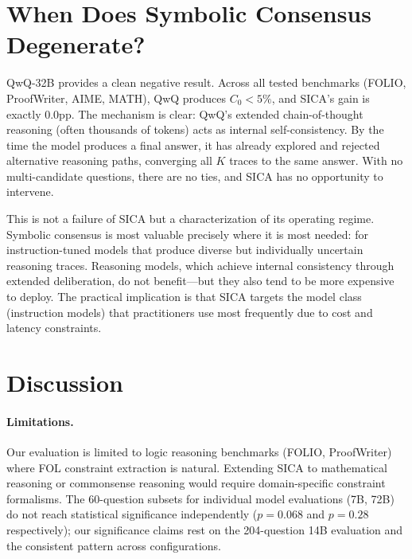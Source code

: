 \documentclass[11pt,a4paper]{article}
\begin{document}
\section{When Does Symbolic Consensus Degenerate?}
\label{sec:degenerate}

QwQ-32B provides a clean negative result. Across all tested benchmarks (FOLIO, ProofWriter, AIME, MATH), QwQ produces $C_0 < 5\%$, and SICA's gain is exactly 0.0pp. The mechanism is clear: QwQ's extended chain-of-thought reasoning (often thousands of tokens) acts as internal self-consistency. By the time the model produces a final answer, it has already explored and rejected alternative reasoning paths, converging all $K$ traces to the same answer. With no multi-candidate questions, there are no ties, and SICA has no opportunity to intervene.

This is not a failure of SICA but a characterization of its operating regime. Symbolic consensus is most valuable precisely where it is most needed: for instruction-tuned models that produce diverse but individually uncertain reasoning traces. Reasoning models, which achieve internal consistency through extended deliberation, do not benefit---but they also tend to be more expensive to deploy. The practical implication is that SICA targets the model class (instruction models) that practitioners use most frequently due to cost and latency constraints.

\section{Discussion}

\paragraph{Limitations.}
Our evaluation is limited to logic reasoning benchmarks (FOLIO, ProofWriter) where FOL constraint extraction is natural. Extending SICA to mathematical reasoning or commonsense reasoning would require domain-specific constraint formalisms. The 60-question subsets for individual model evaluations (7B, 72B) do not reach statistical significance independently ($p=0.068$ and $p=0.28$ respectively); our significance claims rest on the 204-question 14B evaluation and the consistent pattern across configurations.
\end{document}

